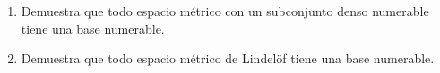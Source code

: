 
   \item 
    \begin{enumerate}
        \item Demuestra que todo espacio métrico con un subconjunto denso numerable tiene una base numerable.
        \item Demuestra que todo espacio métrico de Lindelöf tiene una base numerable.
    \end{enumerate}

   